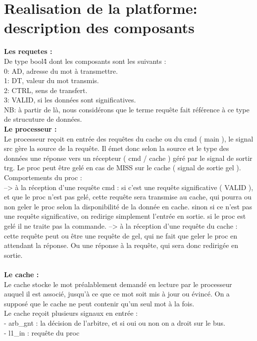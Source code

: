\documentclass{article}
\begin{document}
\section{Realisation de la platforme: description des composants}
\textbf{Les requetes :}\\
De type bool\^4 dont les composants sont les suivants :\\
0: AD, adresse du mot à transmettre.\\
1: DT, valeur du mot transmis.\\
2: CTRL, sens de transfert.\\
3: VALID, si les données sont significatives.\\
NB: à partir de là, nous considérons que le terme requête fait référence à ce type de strucuture de données.
\\
\textbf{Le processeur :}\\
Le processeur reçoit en entrée des requêtes du cache ou du cmd ( main ), le signal src gère la source de la requête. Il émet donc selon la source et le type des données une réponse vers un récepteur ( cmd / cache ) géré par le signal de sortir trg. Le proc peut être gelé en cas de MISS sur le cache ( signal de sortie gel ).\\
Comportements du proc :\\
--> à la réception d'une requête cmd : si c'est une requête significative ( VALID ), et que le proc n'est pas gelé, cette requête sera transmise au cache, qui pourra ou non geler le proc selon la disponibilité de la donnée en cache. sinon si ce n'est pas une requête significative, on redirige simplement l'entrée en sortie. si le proc est gelé il ne traite pas la commande.
--> à la réception d'une requête du cache : cette requête peut ou être une requête de gel, qui ne fait que geler le proc en attendant la réponse. Ou une réponse à la requête, qui sera donc redirigée en sortie.\\
\\
\textbf{Le cache :}\\
Le cache stocke le mot préalablement demandé en lecture par le processeur auquel il est associé, jusqu'à ce que ce mot soit mis à jour ou évincé. On a supposé que le cache ne peut contenir qu'un seul mot à la fois.\\
Le cache reçoit plusieurs signaux en entrée :\\
- arb\_gnt : la décision de l'arbitre, et si oui ou non on a droit sur le bus.\\
- l1\_in : requête du proc\\
\end{document}
